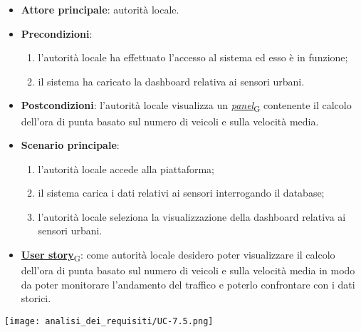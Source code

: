 \begin{itemize}
	\item \textbf{Attore principale}: autorità locale.
	\item \textbf{Precondizioni}:
	      \begin{enumerate}
		      \item l'autorità locale ha effettuato l'accesso al sistema ed esso è in funzione;
		      \item il sistema ha caricato la dashboard relativa ai sensori urbani.
	      \end{enumerate}
	\item \textbf{Postcondizioni}: l'autorità locale visualizza un \href{https://7last.github.io/docs/pb/documentazione-interna/glossario\#panel}{\textit{panel}\textsubscript{G}} contenente il calcolo dell'ora di punta basato sul numero di veicoli e sulla velocità media.
	\item \textbf{Scenario principale}:
	      \begin{enumerate}
		      \item l'autorità locale accede alla piattaforma;
		      \item il sistema carica i dati relativi ai sensori interrogando il database;
		      \item l'autorità locale seleziona la visualizzazione della dashboard relativa ai sensori urbani.
	      \end{enumerate}
	\item \href{https://7last.github.io/docs/pb/documentazione-interna/glossario\#user-story}{\textbf{User story}\textsubscript{G}}:
	      come autorità locale desidero poter visualizzare il calcolo dell'ora di punta basato sul numero di veicoli e sulla velocità media in modo da poter monitorare
	      l'andamento del traffico e poterlo confrontare con i dati storici.
\end{itemize}
\begin{center}
	\texttt{[image: analisi\_dei\_requisiti/UC-7.5.png]}
\end{center}

